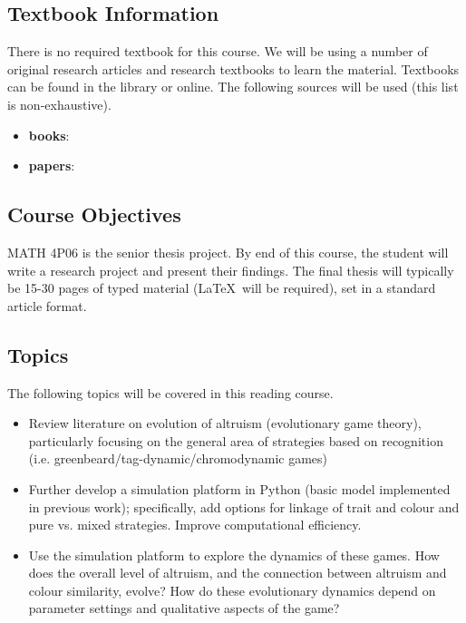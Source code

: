 \documentclass[10pt,oneside]{amsart}
\begin{document}
\subsection*{Textbook Information}  There is no required textbook
for this course.
We will be using a number of original research articles and research
textbooks to learn the material.  Textbooks can be found
in the library or online.  The following sources will be
used (this list is non-exhaustive).
\vspace{.25cm}

\begin{itemize}
\item \textbf{books}: \cite{maynardsmith_evolution_1982,hofbauer_evolutionary_1998,nowak_evolutionary_2006,vincent_evolutionary_2012}
\item \textbf{papers}: \cite{jansen_altruism_2006,traulsen_chromodynamics_2007}
\end{itemize}

\subsection*{Course Objectives} MATH 4P06 is the senior thesis project.  By 
end of this course, the student will write a research project and
present their findings.  The final thesis will typically be 15-30 pages of 
typed material  (\LaTeX\ will be required), set in a standard article 
format.

\subsection*{Topics}
The following topics will be covered in
this reading course.

\begin{itemize}
\item Review literature on evolution of altruism (evolutionary game theory), particularly focusing on the general area of strategies based on recognition (i.e. greenbeard/tag-dynamic/chromodynamic games)
\item Further develop a simulation platform in Python (basic model implemented in previous work); specifically, add options for linkage of trait and colour and pure vs. mixed strategies. Improve computational efficiency.
\item Use the simulation platform to explore the dynamics of these games. How does the overall level of altruism, and the connection between altruism and colour similarity, evolve?  How do these evolutionary dynamics depend on parameter settings and qualitative aspects of the game?
\end{itemize}
\end{document}
